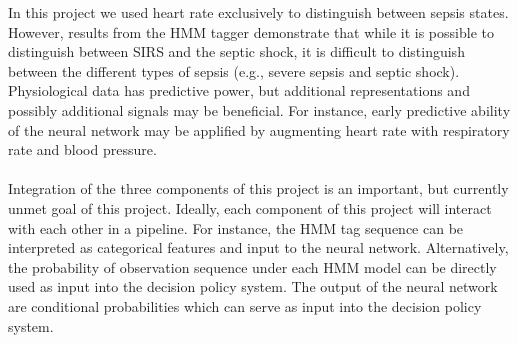 \documentclass[12pt,solutions]{article}
\begin{document}
In this project we used heart rate exclusively to distinguish between sepsis states. However, results from the HMM tagger demonstrate
that while it is possible to distinguish between SIRS and the septic shock, it is difficult to distinguish between the different types
of sepsis (e.g., severe sepsis and septic shock). Physiological data has predictive power, but additional representations and possibly additional signals may be beneficial. For instance, early predictive ability of the neural network may be applified by augmenting  heart rate with respiratory rate and blood pressure.
\\
\\
Integration of the three components of this project is an important, but currently unmet goal of this project. Ideally, each component of
this project will interact with each other in a pipeline. For instance, the HMM tag sequence can be interpreted as categorical features and 
input to the neural network. Alternatively, the probability of observation sequence under each HMM model can be directly used as input into
the decision policy system. The output of the neural network are conditional probabilities which can serve as input into the decision policy 
system.




\end{document}

